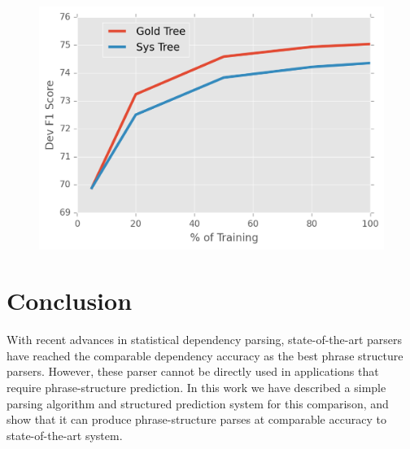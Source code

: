 \documentclass[11pt,letterpaper]{article}
\begin{document}
\begin{figure}
  \centering
  \includegraphics[scale=0.5]{../notebooks/data}
\label{fig:dataamo}
\end{figure}



\section{Conclusion}

With recent advances in statistical dependency parsing, state-of-the-art parsers
have reached the comparable  dependency accuracy as the best phrase structure parsers. However,
these parser cannot be directly used in applications that require phrase-structure prediction. In this work
we have described a simple parsing algorithm and structured prediction system for this comparison, and show that it
can produce phrase-structure parses at comparable accuracy to state-of-the-art system.







\end{document}

